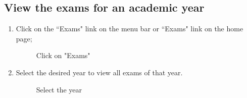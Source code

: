 \documentclass[ManualeUtente]{subfiles}
\begin{document}
	\subsection{View the exams for an academic year}
	\begin{enumerate}
		\item Click on the \textquotedblleft Exams" link on the menu bar or \textquotedblleft Exams" link on the home page;
		\begin{figure}[H]
			\centering
			\caption{Click on "Exams"}
			\label{fig:Click on "Exams"}
		\end{figure}
		\item Select the desired year to view all exams of that year.
		\begin{figure}[H]
			\centering
			\caption{Select the year}
			\label{fig:Select the year}
		\end{figure}
	\end{enumerate}
\end{document}
